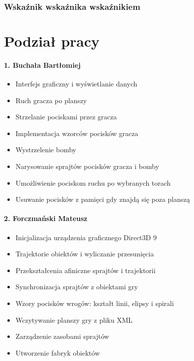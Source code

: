 \documentclass[a4paper,twoside]{article}
\begin{document}
		\section{Wskaźnik wskaźnika wskaźnikiem}
			
	
	\newpage
	\part{Podział pracy}
		\subsection*{1. Buchała Bartłomiej}
			\begin{itemize}
				\item Interfejs graficzny i wyświetlanie danych
				\item Ruch gracza po planszy
				\item Strzelanie pociskami przez gracza
				\item Implementacja wzorców pocisków gracza
				\item Wystrzelenie bomby
				\item Narysowanie sprajtów pocisków gracza i bomby
				\item Umożliwienie pociskom ruchu po wybranych torach
				\item Usuwanie pocisków z pamięci gdy znajdą się poza planszą
			\end{itemize}
		
		\subsection*{2. Forczmański Mateusz}
			\begin{itemize}
				\item Inicjalizacja urządzenia graficznego Direct3D 9
				\item Trajektorie obiektów i wyliczanie przesunięcia
				\item Przekształcenia afiniczne sprajtów i trajektorii
				\item Synchronizacja sprajtów z obiektami gry
				\item Wzory pocisków wrogów: kształt linii, elipsy i spirali
				\item Wczytywanie planszy gry z pliku XML
				\item Zarządzenie zasobami sprajtów
				\item Utworzenie fabryk obiektów
			\end{itemize}
		
\end{document}
